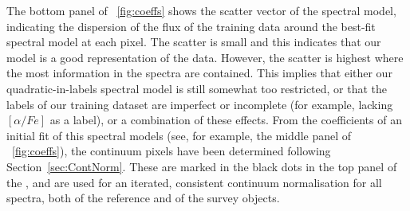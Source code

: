 \documentclass[12pt, preprint]{aastex}
\newcommand{\sectionname}{Section}
\newcommand{\tc}{\textsl{The~Cannon}}
\begin{document}
The bottom panel of \figurename~\ref{fig:coeffs} shows the scatter vector of the spectral model, 
indicating the dispersion of the flux of the training data around the best-fit spectral model at each pixel. 
The scatter is small and this indicates that our model is a good representation of the data. 
However, the scatter is highest where the most information in the spectra are contained. 
This implies that either our quadratic-in-labels spectral model is still somewhat too restricted, or that the labels of our training dataset are imperfect or incomplete 
(for example, lacking $[\alpha / Fe]$ as a label), or a combination of these effects. 
From the coefficients of an initial fit of this spectral models (see, for example, the middle panel of \figurename~\ref{fig:coeffs}), 
the continuum pixels have been determined following \sectionname~\ref{sec:ContNorm}. 
These are marked in the black dots in the top panel of the \figurename, and are used for an iterated, 
consistent continuum normalisation for all spectra, both of the reference and of the survey objects.

\end{document}
